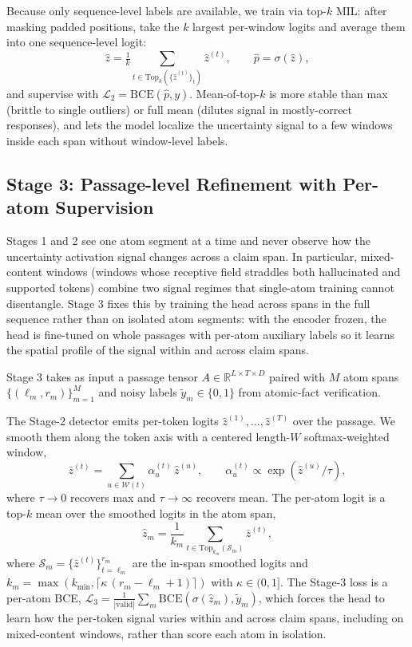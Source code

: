 Because only sequence-level labels are
available, we train via top-$k$ MIL: after masking padded positions,
take the $k$ largest per-window logits and average them into one
sequence-level logit:
\begin{equation}
\hat{z} = \tfrac{1}{k}\!\!\!\sum_{t \in \mathrm{Top}_k(\{\hat{z}^{(t)}\}_t)}\!\!\!\hat{z}^{(t)}, \qquad \hat{p} = \sigma(\hat{z}),
\end{equation}
and supervise with $\mathcal{L}_{2} = \mathrm{BCE}(\hat{p}, y)$.
Mean-of-top-$k$ is more stable than max (brittle to single outliers)
or full mean (dilutes signal in mostly-correct responses), and lets
the model localize the uncertainty signal to a few windows inside
each span without window-level labels.

\subsection{Stage 3: Passage-level Refinement with Per-atom Supervision}
\label{sec:stage3}

Stages 1 and 2 see one atom segment at a time and never observe how the
uncertainty activation signal changes across a claim span. In
particular, mixed-content windows (windows whose receptive field
straddles both hallucinated and supported tokens) combine two signal
regimes that single-atom training cannot disentangle. Stage 3 fixes
this by training the head across spans in the full sequence rather
than on isolated atom segments: with the encoder frozen, the head is
fine-tuned on whole passages with per-atom auxiliary labels so it
learns the spatial profile of the signal within and across claim
spans.

Stage 3 takes as input a passage tensor
$A \in \mathbb{R}^{L \times T \times D}$ paired with $M$ atom spans
$\{(\ell_m, r_m)\}_{m=1}^{M}$ and noisy labels
$\tilde{y}_m \in \{0,1\}$ from atomic-fact verification.

The Stage-2 detector emits per-token logits
$\hat{z}^{(1)}, \ldots, \hat{z}^{(T)}$ over the passage. We smooth
them along the token axis with a centered length-$W$ softmax-weighted
window,
\begin{equation}
\bar{z}^{(t)} = \!\!\!\!\!\sum_{u \in \mathcal{W}(t)}\!\!\!\! \alpha_u^{(t)}\, \hat{z}^{(u)},\qquad \alpha_u^{(t)} \propto \exp(\hat{z}^{(u)}/\tau),
\end{equation}
where $\tau \to 0$ recovers max and $\tau \to \infty$ recovers mean.
The per-atom logit is a top-$k$ mean over the smoothed logits in the
atom span,
\begin{equation}
\hat{z}_m = \frac{1}{k_m}\!\!\!\sum_{t \in \mathrm{Top}_{k_m}(\mathcal{S}_m)}\!\!\! \bar{z}^{(t)},
\end{equation}
where $\mathcal{S}_m = \{\bar{z}^{(t)}\}_{t=\ell_m}^{r_m}$ are the
in-span smoothed logits and
$k_m = \max(k_{\min}, \lceil \kappa\,(r_m - \ell_m + 1) \rceil)$ with
$\kappa \in (0, 1]$. The Stage-3 loss is a per-atom BCE,
$\mathcal{L}_{3} = \tfrac{1}{|\mathrm{valid}|}\sum_m \mathrm{BCE}(\sigma(\hat{z}_m), \tilde{y}_m)$,
which forces the head to learn how the per-token signal varies within
and across claim spans, including on mixed-content windows, rather
than score each atom in isolation.

